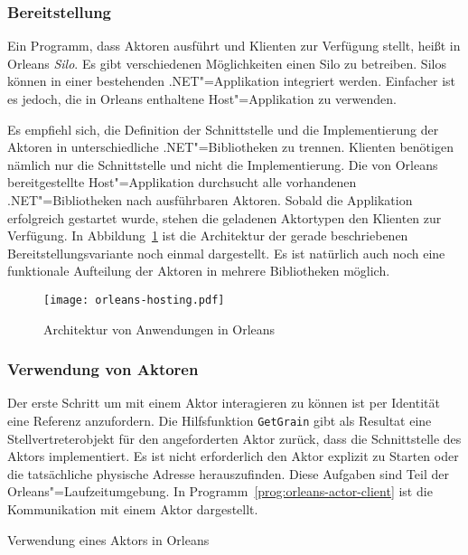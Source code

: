 \subsubsection{Bereitstellung}

Ein Programm, dass Aktoren ausführt und Klienten zur Verfügung stellt, heißt in Orleans \textit{Silo}. Es gibt verschiedenen Möglichkeiten einen Silo zu betreiben. Silos können in einer bestehenden .NET"=Applikation integriert werden. Einfacher ist es jedoch, die in Orleans enthaltene Host"=Applikation zu verwenden. 

Es empfiehl sich, die Definition der Schnittstelle und die Implementierung der Aktoren in unterschiedliche .NET"=Bibliotheken zu trennen. Klienten benötigen nämlich nur die Schnittstelle und nicht die Implementierung. Die von Orleans bereitgestellte Host"=Applikation durchsucht alle vorhandenen .NET"=Bibliotheken nach ausführbaren Aktoren. Sobald die Applikation erfolgreich gestartet wurde, stehen die geladenen Aktortypen den Klienten zur Verfügung. In Abbildung~\ref{fig:orleans-arch} ist die Architektur der gerade beschriebenen Bereitstellungsvariante noch einmal dargestellt. Es ist natürlich auch noch eine funktionale Aufteilung der Aktoren in mehrere Bibliotheken möglich.

\begin{figure}[!hbt]%
\texttt{[image: orleans-hosting.pdf]}%
\caption{Architektur von Anwendungen in Orleans}%
\label{fig:orleans-arch}%
\end{figure}

\subsubsection{Verwendung von Aktoren}

Der erste Schritt um mit einem Aktor interagieren zu können ist per Identität eine Referenz anzufordern. Die Hilfsfunktion \lstinline{GetGrain} gibt als Resultat eine Stellvertreterobjekt für den angeforderten Aktor zurück, dass die Schnittstelle des Aktors implementiert. Es ist nicht erforderlich den Aktor explizit zu Starten oder die tatsächliche physische Adresse herauszufinden. Diese Aufgaben sind Teil der Orleans"=Laufzeitumgebung. In Programm~\ref{prog:orleans-actor-client} ist die Kommunikation mit einem Aktor dargestellt.

\begin{program}[!hbt]
\caption{Verwendung eines Aktors in Orleans}
\label{prog:orleans-actor-client}
\end{program}

